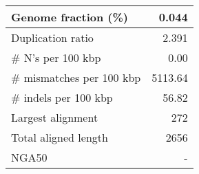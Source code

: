\documentclass[12pt,a4paper]{article}
\begin{document}
\begin{table}[ht]
\begin{center}
\begin{tabular}{|l*{1}{|r}|}
Genome fraction (\%) & 0.044 \\ \hline
Duplication ratio & 2.391 \\ \hline
\# N's per 100 kbp & 0.00 \\ \hline
\# mismatches per 100 kbp & 5113.64 \\ \hline
\# indels per 100 kbp & 56.82 \\ \hline
Largest alignment & 272 \\ \hline
Total aligned length & 2656 \\ \hline
NGA50 & - \\ \hline
\end{tabular}
\end{center}
\end{table}
\end{document}
